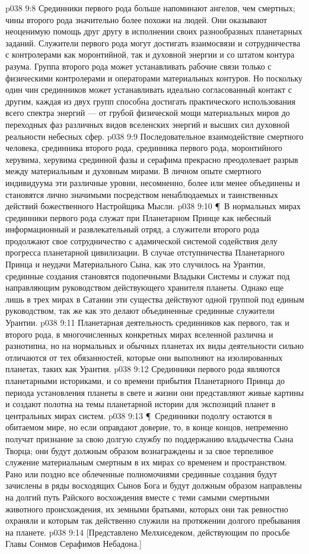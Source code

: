 \vs p038 9:8 Срединники первого рода больше напоминают ангелов, чем смертных; чины второго рода значительно более похожи на людей. Они оказывают неоценимую помощь друг другу в исполнении своих разнообразных планетарных заданий. Служители первого рода могут достигать взаимосвязи и сотрудничества с контролерами как моронтийной, так и духовной энергии и со штатом контура разума. Группа второго рода может устанавливать рабочие связи только с физическими контролерами и операторами материальных контуров. Но поскольку один чин срединников может устанавливать идеально согласованный контакт с другим, каждая из двух групп способна достигать практического использования всего спектра энергий --- от грубой физической мощи материальных миров до переходных фаз различных видов вселенских энергий и высших сил духовной реальности небесных сфер.
\vs p038 9:9 Последовательное взаимодействие смертного человека, срединника второго рода, срединника первого рода, моронтийного херувима, херувима срединной фазы и серафима прекрасно преодолевает разрыв между материальным и духовным мирами. В личном опыте смертного индивидуума эти различные уровни, несомненно, более или менее объединены и становятся лично значимыми посредством ненаблюдаемых и таинственных действий божественного Настройщика Мысли.
\vs p038 9:10 \P\ В нормальных мирах срединники первого рода служат при Планетарном Принце как небесный информационный и развлекательный отряд, а служители второго рода продолжают свое сотрудничество с адамической системой содействия делу прогресса планетарной цивилизации. В случае отступничества Планетарного Принца и неудачи Материального Сына, как это случилось на Урантии, срединные создания становятся подопечными Владыки Системы и служат под направляющим руководством действующего хранителя планеты. Однако еще лишь в трех мирах в Сатании эти существа действуют одной группой под единым руководством, так же как это делают объединенные срединные служители Урантии.
\vs p038 9:11 Планетарная деятельность срединников как первого, так и второго рода, в многочисленных конкретных мирах вселенной различна и разнотипна, но на нормальных и обычных планетах их виды деятельности сильно отличаются от тех обязанностей, которые они выполняют на изолированных планетах, таких как Урантия.
\vs p038 9:12 Срединники первого рода являются планетарными историками, и со времени прибытия Планетарного Принца до периода установления планеты в свете и жизни они представляют живые картины и создают полотна на темы планетарной истории для экспозиций планет в центральных мирах систем.
\vs p038 9:13 \P\ Срединники подолгу остаются в обитаемом мире, но если оправдают доверие, то, в конце концов, непременно получат признание за свою долгую службу по поддержанию владычества Сына Творца; они будут должным образом вознаграждены и за свое терпеливое служение материальным смертным в их мирах со временем и пространством. Рано или поздно все облеченные полномочиями срединные создания будут зачислены в ряды восходящих Сынов Бога и будут должным образом направлены на долгий путь Райского восхождения вместе с теми самыми смертными животного происхождения, их земными братьями, которых они так ревностно охраняли и которым так действенно служили на протяжении долгого пребывания на планете.
\vs p038 9:14 [Представлено Мелхиседеком, действующим по просьбе Главы Сонмов Серафимов Небадона.]
